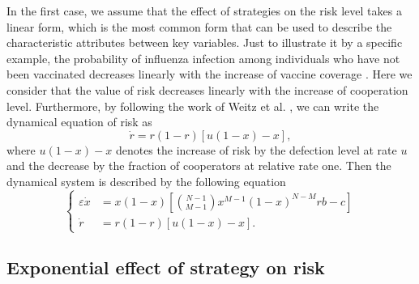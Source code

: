 \documentclass[9pt]{elife}
\begin{document}
In the first case, we assume that the effect of strategies on the risk level takes a linear form, which is the most common form that can be used to describe the characteristic attributes between key variables. Just to illustrate it by a specific example, the probability of influenza infection among individuals who have not been vaccinated decreases linearly with the increase of vaccine coverage \citep{vardavas2007can}. Here we consider that the  value of risk decreases linearly with the increase of cooperation level. Furthermore, by following the work of Weitz et al. \citep{weitz2016oscillating}, we can write the dynamical equation of risk as
\begin{equation}
\dot{r}=r(1-r)[u(1-x)-x],
\end{equation}
where $u(1-x)-x$ denotes the increase of risk by the defection level at rate $u$ and the decrease by the fraction of cooperators at relative rate one. Then the dynamical system is described by the following equation
\begin{equation}\label{eq5}
\left\{
\begin{aligned}
\varepsilon\dot{x}&=x(1-x)[\binom{N-1}{M-1}x^{M-1}(1-x)^{N-M}rb-c]\\
\dot{r}&=r(1-r)[u(1-x)-x].
\end{aligned}
\right.
\end{equation}

\subsection{Exponential effect of strategy on risk}
\end{document}
